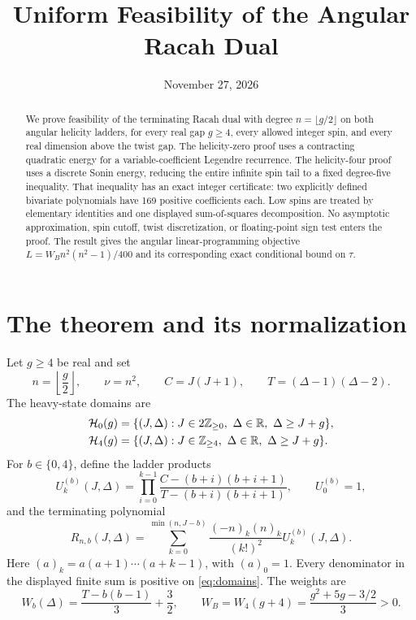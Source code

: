 \documentclass[11pt]{article}
\title{Uniform Feasibility of the Angular Racah Dual}
\author{}
\date{November 27, 2026}
\theoremstyle{remark}
\numberwithin{equation}{section}
\newcommand{\R}{\mathbb R}
\newcommand{\Z}{\mathbb Z}
\newcommand{\WB}{W_B}
\newcommand{\cH}{\mathcal H}
\begin{document}
\maketitle
\vspace{-1.5em}

\begin{abstract}
We prove feasibility of the terminating Racah dual with degree
$n=\lfloor g/2\rfloor$ on both angular helicity ladders, for every real gap
$g\ge4$, every allowed integer spin, and every real dimension above the twist
gap. The helicity-zero proof uses a contracting quadratic energy for a
variable-coefficient Legendre recurrence. The helicity-four proof uses a
discrete Sonin energy, reducing the entire infinite spin tail to a fixed
degree-five inequality. That inequality has an exact integer certificate:
two explicitly defined bivariate polynomials have 169 positive coefficients
each. Low spins are treated by elementary identities and one displayed
sum-of-squares decomposition. No asymptotic approximation, spin cutoff,
twist discretization, or floating-point sign test enters the proof. The
result gives the angular linear-programming objective
$L=\WB n^2(n^2-1)/400$ and its corresponding exact conditional bound on
$\tau$.
\end{abstract}

\section{The theorem and its normalization}
\label{sec:theorem}

Let $g\ge4$ be real and set
\begin{equation}
 n=\left\lfloor\frac g2\right\rfloor,\qquad
 \nu=n^2,\qquad
 C=J(J+1),\qquad T=(\Delta-1)(\Delta-2).
 \label{eq:basic}
\end{equation}
The heavy-state domains are
\begin{align}
 \cH_0(g)&=\{(J,\Delta):J\in2\Z_{\ge0},\ \Delta\in\R,
                  \ \Delta\ge J+g\},\notag\\
 \cH_4(g)&=\{(J,\Delta):J\in\Z_{\ge4},\ \Delta\in\R,
                  \ \Delta\ge J+g\}.
 \label{eq:domains}
\end{align}
For $b\in\{0,4\}$, define the ladder products
\begin{equation}
 U_k^{(b)}(J,\Delta)
 =\prod_{i=0}^{k-1}
   \frac{C-(b+i)(b+i+1)}{T-(b+i)(b+i+1)},
 \qquad U_0^{(b)}=1,
 \label{eq:ladderU}
\end{equation}
and the terminating polynomial
\begin{equation}
 R_{n,b}(J,\Delta)
 =\sum_{k=0}^{\min(n,J-b)}
    \frac{(-n)_k(n)_k}{(k!)^2}U_k^{(b)}(J,\Delta).
 \label{eq:Rdef}
\end{equation}
Here $(a)_k=a(a+1)\cdots(a+k-1)$, with $(a)_0=1$.
Every denominator in the displayed finite sum is positive on
\eqref{eq:domains}. The weights are
\begin{equation}
 W_b(\Delta)=\frac{T-b(b-1)}3+\frac32,
 \qquad
 \WB=W_4(g+4)=\frac{g^2+5g-3/2}{3}>0.
 \label{eq:weights}
\end{equation}
\end{document}

